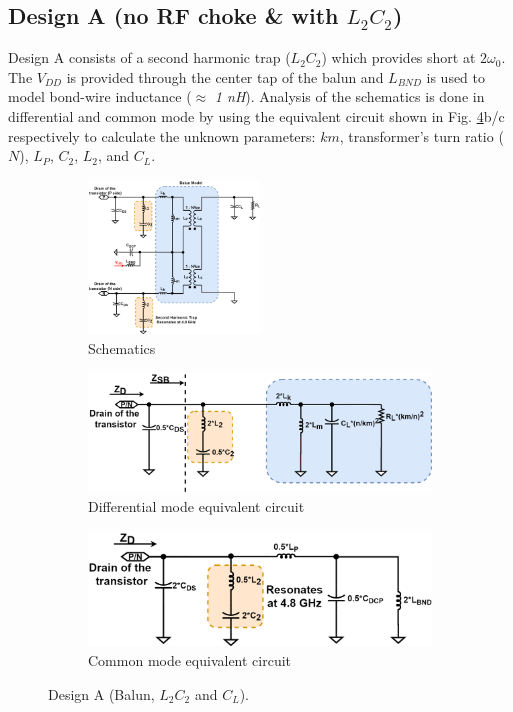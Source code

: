 \documentclass[conference]{IEEEtran}
\begin{document}
\subsection{Design A (no RF choke \& with $L_2C_2$)}
Design A consists of a second harmonic trap ($L_2C_2$) which provides short at $2\omega_0$. The $V_{DD}$ is provided through the center tap of the balun and $L_{BND}$ is used to model bond-wire inductance ($\approx$ \textit{1 nH}).
Analysis of the schematics is done in differential and common mode by using the equivalent circuit shown in Fig. \ref{fig:Design_A}b/c respectively to calculate the unknown parameters: $km$, transformer's turn ratio ($N$), $L_P$, $C_2$, $L_2$, and $C_L$.
\begin{figure}[!t]
\captionsetup{font=footnotesize}
\centering
\begin{subfigure}{0.5\textwidth}
\centering
\includegraphics[width=0.5\textwidth]{Images/Design/Design_A_FC.png}
\caption{Schematics}
\label{fig:Design_A_FC}
\end{subfigure}
\begin{subfigure}[b]{0.24\textwidth}
\includegraphics[width=1\textwidth]{Images/Design/Design_A_Diff.png}
\caption{Differential mode equivalent circuit}
\label{fig:Design_A_Diff}
\end{subfigure}
\begin{subfigure}[b]{0.24\textwidth}
\includegraphics[width=1\textwidth]{Images/Design/Design_A_Com.png}
\caption{Common mode equivalent circuit}
\label{fig:Design_A_Com}
\end{subfigure}
\caption{Design A (Balun, $L_2C_2$ and $C_L$).}
\label{fig:Design_A}
\vspace{-0.3in}
\end{figure}
\end{document}
